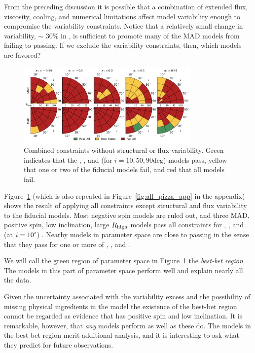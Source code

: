 From the preceding discussion it is possible that a combination of extended flux, viscosity, cooling, and numerical limitations affect model variability enough to compromise the variability constraints.
Notice that a relatively small change in variability, $\sim$ 30\% in , is sufficient to promote many of the MAD models from failing to passing.
If we exclude the variability constraints, then, which models are favored?

\begin{figure}
  \centering
  \includegraphics[width=0.8\textwidth]{./figures/All_Constraints.png}
  \caption{Combined constraints without structural or flux variability.
Green indicates that the \kharma, \bhac, and (for $i = 10, 50, 90$deg) \hamr models pass, yellow that one or two of the fiducial models fail, and red that all models fail.}
  \label{fig:all_pizza}
\end{figure}

Figure~\ref{fig:all_pizza} (which is also repeated in Figure~\ref{fig:all_pizza_app} in the appendix) shows the result of applying all constraints except structural and flux variability to the fiducial models.
Most negative spin models are ruled out, and three MAD, positive spin, low inclination, large $R_\mathrm{high}$ models pass all constraints for \kharma, \bhac, and (at $i = 10\degree$) \hamr.
Nearby models in parameter space are close to passing in the sense that they pass for one or more of \kharma, \bhac, and \hamr.

We will call the green region of parameter space in Figure~\ref{fig:all_pizza} the {\em best-bet region}.
The models in this part of parameter space perform well and explain nearly all the data.

Given the uncertainty associated with the variability excess and the possibility of missing physical ingredients in the model the existence of the best-bet region cannot be regarded as evidence that \sgra has positive spin and low inclination.
It is remarkable, however, that {\em any} models perform as well as these do.
The models in the best-bet region merit additional analysis, and it is interesting to ask what they predict for future observations.

